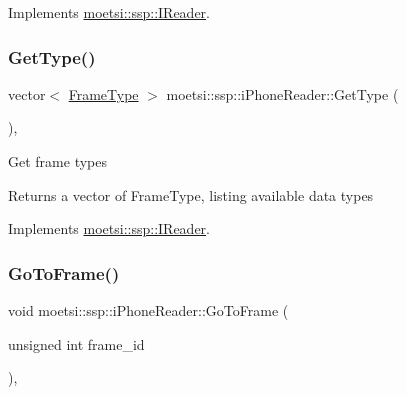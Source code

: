 Implements \hyperlink{classmoetsi_1_1ssp_1_1IReader_a9f6a8650ca290b011b8e5451eeae9f32}{moetsi\+::ssp\+::\+I\+Reader}.

\mbox{\label{classmoetsi_1_1ssp_1_1iPhoneReader_a05d285ace85fc570bc2f453a0862ae56}} 
\subsubsection{\texorpdfstring{Get\+Type()}{GetType()}}
{\footnotesize\ttfamily vector$<$ \hyperlink{namespacemoetsi_1_1ssp_a46efdfa2cd5a28ead465dcc8006b5a87}{Frame\+Type} $>$ moetsi\+::ssp\+::i\+Phone\+Reader\+::\+Get\+Type (\begin{DoxyParamCaption}{ }\end{DoxyParamCaption})\hspace{0.3cm}{\ttfamily [override]}, {\ttfamily [virtual]}}

Get frame types \begin{DoxyReturn}{Returns}
a vector of Frame\+Type, listing available data types 
\end{DoxyReturn}


Implements \hyperlink{classmoetsi_1_1ssp_1_1IReader_a4116c1931fde7bd66133934ffdca1cce}{moetsi\+::ssp\+::\+I\+Reader}.

\mbox{\label{classmoetsi_1_1ssp_1_1iPhoneReader_a27b6dea97e4c4db8e4e749cc9e30e7ca}} 
\subsubsection{\texorpdfstring{Go\+To\+Frame()}{GoToFrame()}}
{\footnotesize\ttfamily void moetsi\+::ssp\+::i\+Phone\+Reader\+::\+Go\+To\+Frame (\begin{DoxyParamCaption}\item[{unsigned int}]{frame\+\_\+id }\end{DoxyParamCaption})\hspace{0.3cm}{\ttfamily [override]}, {\ttfamily [virtual]}}

